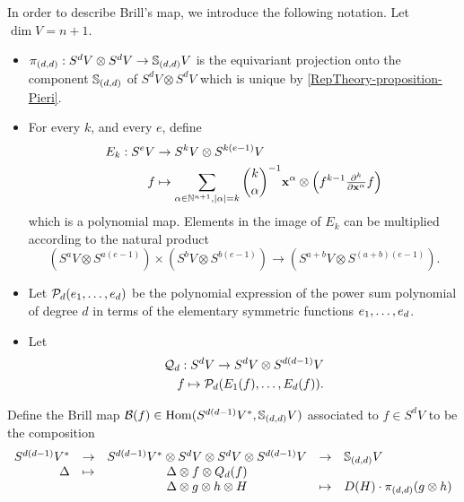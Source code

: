 In order to describe Brill's map, we introduce the following notation. Let $\dim V = n+1$.
\begin{itemize}
 \item $\pi_{(d,d)}: S^d V \otimes S^d V \to \mathbb{S}_{(d,d)} V$ is the equivariant projection onto the component $ \mathbb{S}_{(d,d)}$ of $S^d V \otimes S^d V$ which is unique by \ref{RepTheory-proposition-Pieri}.
 \item For every $k$, and every $e$, define
 \[
 \begin{aligned}
 E_k : S^e V &\to S^{k} V \otimes S^{k(e-1)}V  \\
 f &\mapsto \sum_{\alpha \in \mathbb{N}^{n+1}, |\alpha| = k} \binom{k}{\alpha}^{-1} \mathbf{x}^\alpha \otimes \left( f^{k-1}\textstyle \frac{\partial^k}{\partial \mathbf{x}^\alpha} f \right)
\end{aligned}
 \]
 which is a polynomial map. Elements in the image of $E_k$ can be multiplied according to the natural product 
 \[
( S^a V \otimes S^{a(e-1)} ) \times ( S^b V \otimes S^{b(e-1)} )  \to ( S^{a+b} V \otimes S^{(a+b)(e-1)} ).
\]
 \item Let $\mathcal{P}_d ( e_1 , \ldots , e_d)$ be the polynomial expression of the power sum polynomial of degree $d$ in terms of the elementary symmetric functions $e_1 , \ldots , e_d$. 
 \item Let 
 \[
 \begin{aligned}
 \mathcal{Q}_{d} : S^d V \to S^d V \otimes S^{d(d-1)}V \\
 f \mapsto \mathcal{P}_d ( E_1(f) , \ldots , E_d(f)).
 \end{aligned}
 \]
\end{itemize}
Define the Brill map $\mathcal{B}(f) \in \operatorname{Hom} ( S^{d(d-1)}V^* , \mathbb{S}_{(d,d)} V)$ associated to $f \in S^d V$ to be the composition
\[
\begin{array}{rcccl}
S^{d(d-1)}V^* &\to & S^{d(d-1)}V^* \otimes S^d V \otimes S^d V \otimes S^{d(d-1)} V & \to & \mathbb{S}_{(d,d)} V \\
\Delta &\mapsto &\Delta \otimes f \otimes Q_d(f)  & &\\
& & \Delta \otimes g \otimes h \otimes H &\mapsto & D(H) \cdot \pi_{(d,d)} (g \otimes h)
\end{array}
 \]




